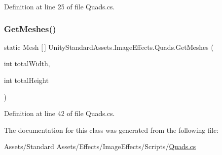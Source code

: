 Definition at line 25 of file Quads.\+cs.

\mbox{\label{class_unity_standard_assets_1_1_image_effects_1_1_quads_a6c31cbed0f5d3f850d2da956e4bdaddb}} 
\subsubsection{\texorpdfstring{Get\+Meshes()}{GetMeshes()}}
{\footnotesize\ttfamily static Mesh \mbox{[}$\,$\mbox{]} Unity\+Standard\+Assets.\+Image\+Effects.\+Quads.\+Get\+Meshes (\begin{DoxyParamCaption}\item[{int}]{total\+Width,  }\item[{int}]{total\+Height }\end{DoxyParamCaption})\hspace{0.3cm}{\ttfamily [static]}}



Definition at line 42 of file Quads.\+cs.



The documentation for this class was generated from the following file\+:\begin{DoxyCompactItemize}
\item 
Assets/\+Standard Assets/\+Effects/\+Image\+Effects/\+Scripts/\mbox{\hyperlink{_quads_8cs}{Quads.\+cs}}\end{DoxyCompactItemize}
